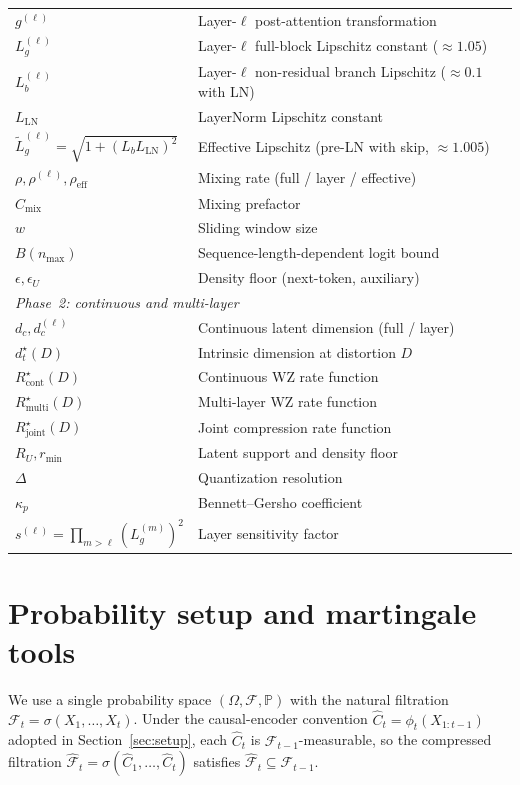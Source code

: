 \documentclass[11pt]{article}
\newcommand{\Prob}{\mathbb{P}}
\newcommand{\F}{\mathcal{F}}
\newcommand{\Fhat}{\hat{\F}}
\newcommand{\Chat}{\hat{C}}
\theoremstyle{plain}
\theoremstyle{definition}
\theoremstyle{remark}
\begin{document}
\begin{table}[ht]
\begin{tabular}{ll}
$g^{(\ell)}$ & Layer-$\ell$ post-attention transformation \\
$L_g^{(\ell)}$ & Layer-$\ell$ full-block Lipschitz constant ($\approx 1.05$) \\
$L_b^{(\ell)}$ & Layer-$\ell$ non-residual branch Lipschitz ($\approx 0.1$ with LN) \\
$L_{\mathrm{LN}}$ & LayerNorm Lipschitz constant \\
$\tilde L_g^{(\ell)} = \sqrt{1+(L_b L_{\mathrm{LN}})^2}$ & Effective Lipschitz (pre-LN with skip, $\approx 1.005$) \\
$\rho, \rho^{(\ell)}, \rho_{\mathrm{eff}}$ & Mixing rate (full / layer / effective) \\
$C_{\mathrm{mix}}$ & Mixing prefactor \\
$w$ & Sliding window size \\
$B(n_{\max})$ & Sequence-length-dependent logit bound \\
$\epsilon, \epsilon_U$ & Density floor (next-token, auxiliary) \\
\midrule
\multicolumn{2}{l}{\emph{Phase~2: continuous and multi-layer}} \\
$d_c, d_c^{(\ell)}$ & Continuous latent dimension (full / layer) \\
$d^\star_t(D)$ & Intrinsic dimension at distortion $D$ \\
$R^\star_{\mathrm{cont}}(D)$ & Continuous WZ rate function \\
$R^\star_{\mathrm{multi}}(D)$ & Multi-layer WZ rate function \\
$R^\star_{\mathrm{joint}}(D)$ & Joint compression rate function \\
$R_U, r_{\min}$ & Latent support and density floor \\
$\Delta$ & Quantization resolution \\
$\kappa_p$ & Bennett--Gersho coefficient \\
$s^{(\ell)} = \prod_{m>\ell}(L_g^{(m)})^2$ & Layer sensitivity factor \\
\bottomrule
\end{tabular}
\end{table}

\section{Probability setup and martingale tools}\label{app:martingale}

We use a single probability space $(\Omega, \F, \Prob)$ with the
natural filtration $\F_t = \sigma(X_1, \ldots, X_t)$. Under the
causal-encoder convention $\Chat_t = \phi_t(X_{1:t-1})$ adopted in
Section~\ref{sec:setup}, each $\Chat_t$ is $\F_{t-1}$-measurable, so
the compressed filtration $\Fhat_t = \sigma(\Chat_1, \ldots, \Chat_t)$
satisfies $\Fhat_t \subseteq \F_{t-1}$.
\end{document}
